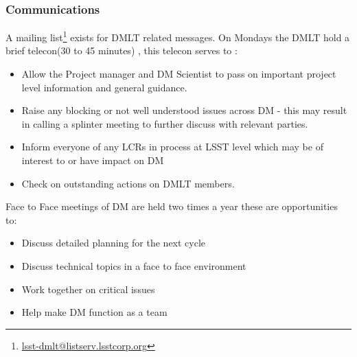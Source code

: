  \subsubsection{Communications} 
 A mailing list\footnote{\url{lsst-dmlt@listserv.lsstcorp.org}} exists for DMLT related messages. 
 On Mondays the DMLT hold a brief telecon(30 to 45 minutes) , this telecon serves to :
\begin{itemize}
\item Allow the Project manager and DM Scientist  to pass on important project level information and general guidance. 
\item Raise any blocking or not well understood issues across DM - this may result in calling a splinter meeting to further discuss with relevant parties.
\item Inform everyone of any LCRs in process at LSST level which may be of interest to or  have impact on DM
\item Check on outstanding actions on DMLT members. 
\end{itemize}

Face to Face meetings of DM are held two times a year these are opportunities to:
\begin{itemize}
\item Discuss detailed planning for the next cycle
\item Discuss technical topics in a face to face environment
\item Work together on critical issues
\item Help make DM function as a team
\end{itemize}


